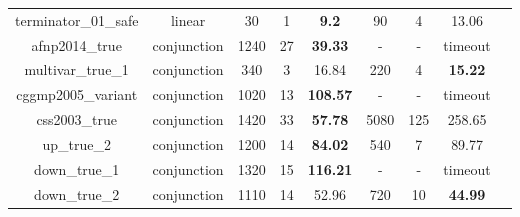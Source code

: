 \begin{table}[t]
\begin{tabular}{l c | c c c | c c c | c }
\multicolumn{1}{|c|}{terminator\_01\_safe}         		&linear 		&30 &1 &\textbf{9.2}  			&90  &4  &13.06  			&\multicolumn{1}{|c|}{\cmark} \\
\multicolumn{1}{|c|}{afnp2014\_true}         			&conjunction	&1240 &27 &\textbf{39.33}		&- &- &timeout  		&\multicolumn{1}{|c|}{\xmark} \\
\multicolumn{1}{|c|}{multivar\_true\_1}         		&conjunction 	&340 &3 &16.84  				&220 &4   &\textbf{15.22}  	&\multicolumn{1}{|c|}{\cmark} \\
\multicolumn{1}{|c|}{cggmp2005\_variant}   				&conjunction 	&1020 &13 &\textbf{108.57}		&- &- &timeout  		&\multicolumn{1}{|c|}{\cmark} \\
\multicolumn{1}{|c|}{css2003\_true}         			&conjunction 	&1420 &33 &\textbf{57.78}		&5080 &125 &258.65  		&\multicolumn{1}{|c|}{\cmark} \\
\multicolumn{1}{|c|}{up\_true\_2}         				&conjunction 	&1200 &14 &\textbf{84.02}  		&540 &7   &89.77  			&\multicolumn{1}{|c|}{\cmark} \\
\multicolumn{1}{|c|}{down\_true\_1}         			&conjunction 	&1320  &15 &\textbf{116.21}  	&-  &-  &timeout  		&\multicolumn{1}{|c|}{\cmark} \\
\multicolumn{1}{|c|}{down\_true\_2}         			&conjunction 	&1110 &14 &52.96  				&720 &10   &\textbf{44.99}  &\multicolumn{1}{|c|}{\cmark} \\

\hline
\end{tabular}
\label{tbl:stats}
\end{table}

